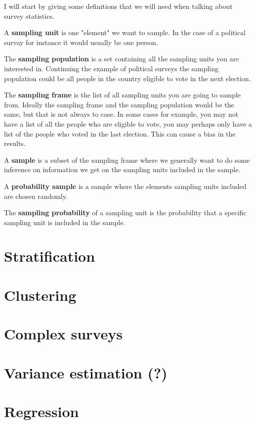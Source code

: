 \documentclass{article}
\begin{document}
I will start by giving some definitions that we will need when talking about survey statistics.

\begin{definition} \label{def:sampUnit}
  A \textbf{sampling unit} is one "element" we want to sample. In the case of a political survay for instance it would usually be one person.
\end{definition}

\begin{definition} \label{def:sampPop}
The \textbf{sampling population} is a set containing all the sampling units you are interested in. Continuing the example of political surveys the sampling population could be all people in the country eligible to vote in the next election.
\end{definition}

\begin{definition} \label{def:sampFrame}
The \textbf{sampling frame} is the list of all sampling units you are going to sample from. Ideally the sampling frame and the sampling population would be the same, but that is not always to case. In some cases for example, you may not have a list of all the people who are eligible to vote, you may perhaps only have a list of the people who voted in the last election. This can cause a bias in the results.
\end{definition}

\begin{definition} \label{def:sample}
A \textbf{sample} is a subset of the sampling frame where we generally want to do some inference on information we get on the sampling units included in the sample.
\end{definition}

\begin{definition} \label{def:probSample}
A \textbf{probability sample} is a sample where the elements sampling units included are chosen randomly.
\end{definition}

\begin{definition} \label{def:sampProb}
The \textbf{sampling probability} of a sampling unit is the probability that a specific sampling unit is included in the sample.
\end{definition}


\section{Stratification}

\section{Clustering}

\section{Complex surveys}

\section{Variance estimation (?)}

\section{Regression}
\end{document}
